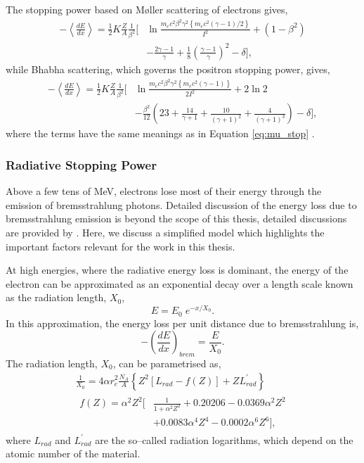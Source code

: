 The stopping power based on M{\o}ller scattering of electrons gives,
\begin{align*}
	- \left< \frac{dE}{dx} \right> = \frac{1}{2} K \frac{Z}{A} \frac{1}{\beta^2}
	\bigg[ &\ln \frac{m_e c^2 \beta^2 \gamma^2 \left\{ m_e c^2 (\gamma - 1) / 2
	\right\} }{I^2} + (1 - \beta^2) \\
	&- \frac{2\gamma - 1}{\gamma} + \frac{1}{8} 
	\left(\frac{\gamma - 1}{\gamma}\right)^2 - \delta \bigg],
\end{align*}
while Bhabha scattering, which governs the positron stopping power, gives,
\begin{align*}
	- \left< \frac{dE}{dx} \right> = \frac{1}{2} K \frac{Z}{A} \frac{1}{\beta^2}
	\bigg[ &\ln \frac{m_e c^2 \beta^2 \gamma^2 \left\{ m_e c^2 (\gamma - 1) 
	\right\} }{2 I^2} 
	+ 2 \ln 2  \\ &-\frac{\beta^2}{12} \left(23 + \frac{14}{\gamma + 1} +
	\frac{10}{(\gamma + 1)^2} + \frac{4}{(\gamma + 1)^3}\right) - \delta \bigg],
\end{align*}
where the terms have the same meanings as in Equation \ref{eq:mu_stop}
\cite{PhysRevD.98.030001}.

\subsubsection*{Radiative Stopping Power}
Above a few tens of MeV, electrons lose most of their energy through the 
emission of bremsstrahlung photons. Detailed discussion of the energy loss due
to bremsstrahlung emission is beyond the scope of this thesis, detailed
discussions are provided by \cite{PhysRevD.98.030001, Tsai:1973py}. Here, we 
discuss a simplified model which highlights the important factors relevant for 
the work in this thesis.

At high energies, where the radiative energy loss is dominant, the energy of 
the electron can be approximated as an exponential decay over a length scale 
known as the radiation length, $X_0$,
\begin{equation*}
	E = E_0 \; e^{-x/X_0}.
\end{equation*}
In this approximation, the energy loss per unit distance due to bremsstrahlung 
is, 
\begin{equation*}
	- \left( \frac{dE}{dx} \right)_{brem} = \frac{E}{X_0}.
\end{equation*}
The radiation length, $X_0$, can be parametrised as,
\begin{equation}
	\begin{gathered}
		\frac{1}{X_0} = 4 \alpha r_e^2 \frac{N_A}{A} \left\{ Z^2 \left[L_{rad} - f(Z)\right] + Z
		L^\prime_{rad} \right\} \\
		\begin{split}
			f(Z) = \alpha^2 Z^2 \bigg[ &\frac{1}{1 + \alpha^2 Z^2} + 0.20206 - 0.0369
			\alpha^2 Z^2 \\ &+ 0.0083 \alpha^4 Z^4 -0.0002 \alpha^6 Z^6 \bigg],
		\end{split}
	\end{gathered}
	\label{eq:rad_length}
\end{equation}
where $L_{rad}$ and $L_{rad}^\prime$ are the so--called radiation logarithms,
which depend on the atomic number of the material\cite{Tsai:1973py}.

